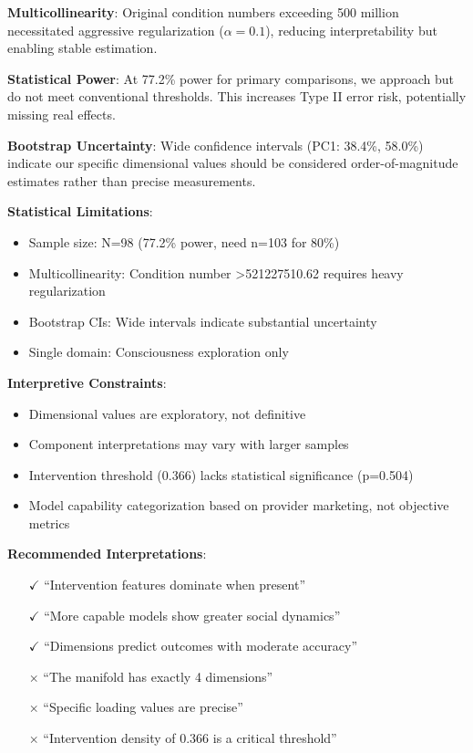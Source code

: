 \documentclass[11pt,letterpaper]{article}
\newcommand{\totalConversations}{98}
\newcommand{\powerOutcomeGroups}{77.2\%}
\newcommand{\sampleSizeForeightyPower}{103}
\newcommand{\conditionNumber}{521227510.62}  %
\newcommand{\regularizationAlpha}{0.1}
\newcommand{\nonInterventionPCOneCILower}{38.4\%}
\newcommand{\nonInterventionPCOneCIUpper}{58.0\%}
\newcommand{\interventionThreshold}{0.366}
\newcommand{\interventionThresholdPValue}{0.504}
\begin{document}
\textbf{Multicollinearity}: Original condition numbers exceeding 500 million necessitated aggressive regularization ($\alpha = \regularizationAlpha{}$), reducing interpretability but enabling stable estimation.

\textbf{Statistical Power}: At \powerOutcomeGroups{} power for primary comparisons, we approach but do not meet conventional thresholds. This increases Type II error risk, potentially missing real effects.

\textbf{Bootstrap Uncertainty}: Wide confidence intervals (PC1: \nonInterventionPCOneCILower{}, \nonInterventionPCOneCIUpper{}) indicate our specific dimensional values should be considered order-of-magnitude estimates rather than precise measurements.

\begin{tcolorbox}[colback=gray!10,colframe=gray!80,title=Study Limitations and Interpretive Constraints]
\textbf{Statistical Limitations}:
\begin{itemize}
    \item Sample size: N=\totalConversations{} (\powerOutcomeGroups{} power, need n=\sampleSizeForeightyPower{} for 80\%)
    \item Multicollinearity: Condition number >\conditionNumber{} requires heavy regularization
    \item Bootstrap CIs: Wide intervals indicate substantial uncertainty
    \item Single domain: Consciousness exploration only
\end{itemize}

\textbf{Interpretive Constraints}:
\begin{itemize}
    \item Dimensional values are exploratory, not definitive
    \item Component interpretations may vary with larger samples
    \item Intervention threshold (\interventionThreshold{}) lacks statistical significance (p=\interventionThresholdPValue{})
    \item Model capability categorization based on provider marketing, not objective metrics
\end{itemize}

\textbf{Recommended Interpretations}:
\begin{itemize}
    \item[$\checkmark$] ``Intervention features dominate when present''
    \item[$\checkmark$] ``More capable models show greater social dynamics''
    \item[$\checkmark$] ``Dimensions predict outcomes with moderate accuracy''
    \item[$\times$] ``The manifold has exactly 4 dimensions''
    \item[$\times$] ``Specific loading values are precise''
    \item[$\times$] ``Intervention density of \interventionThreshold{} is a critical threshold''
\end{itemize}
\end{tcolorbox}
\end{document}

